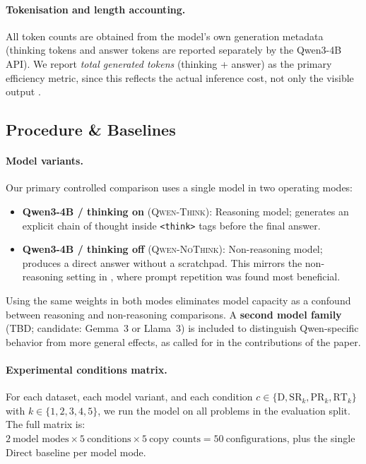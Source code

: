 \paragraph{Tokenisation and length accounting.}
All token counts are obtained from the model's own generation metadata
(thinking tokens and answer tokens are reported separately by the Qwen3-4B API).
We report \emph{total generated tokens} (thinking + answer) as the primary efficiency
metric, since this reflects the actual inference cost, not only the visible output
\cite{leviathan2025prompt}.

\subsection{Procedure \& Baselines}
\label{subsec:procedure}

\paragraph{Model variants.}
Our primary controlled comparison uses a single model in two operating modes:
\begin{itemize}
  \item \textbf{Qwen3-4B / thinking on} (\textsc{Qwen-Think}):
        Reasoning model; generates an explicit chain of thought inside
        \texttt{<think>} tags before the final answer.
  \item \textbf{Qwen3-4B / thinking off} (\textsc{Qwen-NoThink}):
        Non-reasoning model; produces a direct answer without a scratchpad.
        This mirrors the non-reasoning setting in \citet{leviathan2025prompt},
        where prompt repetition was found most beneficial.
\end{itemize}
Using the same weights in both modes eliminates model capacity as a confound between
reasoning and non-reasoning comparisons.
A \textbf{second model family} (TBD; candidate: Gemma~3 or Llama~3) is included
to distinguish Qwen-specific behavior from more general effects, as called for in the
contributions of the paper.

\paragraph{Experimental conditions matrix.}
For each dataset, each model variant, and each condition
$c \in \{\mathrm{D}, \mathrm{SR}_k, \mathrm{PR}_k, \mathrm{RT}_k\}$
with $k \in \{1, 2, 3, 4, 5\}$, we run the model on all problems in the evaluation split.
The full matrix is:
$2\ \text{model modes} \times 5\ \text{conditions} \times 5\ \text{copy counts}
= 50\ \text{configurations}$,
plus the single Direct baseline per model mode.

